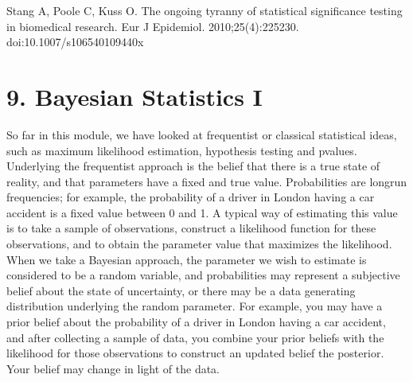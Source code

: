 \documentclass[letterpaper,10pt,english]{jupyterBook}
\begin{document}
\sphinxAtStartPar
Stang A, Poole C, Kuss O. The ongoing tyranny of statistical significance testing in biomedical research. Eur J Epidemiol. 2010;25(4):225\sphinxhyphen{}230. doi:10.1007/s10654\sphinxhyphen{}010\sphinxhyphen{}9440\sphinxhyphen{}x

\sphinxAtStartPar
{}

\sphinxAtStartPar
{}

\sphinxAtStartPar
{}


\chapter{9. Bayesian Statistics I}
\label{\detokenize{09.a. Bayesian Statistics I:bayesian-statistics-i}}\label{\detokenize{09.a. Bayesian Statistics I::doc}}
\sphinxAtStartPar
So far in this module, we have looked at frequentist or classical statistical ideas, such as maximum likelihood estimation, hypothesis testing and p\sphinxhyphen{}values. Underlying the frequentist approach is the belief that there is a true state of reality, and that parameters have a fixed and true value. Probabilities are long\sphinxhyphen{}run frequencies; for example, the probability of a driver in London having a car accident is a fixed value between 0 and 1. A typical way of estimating this value is to take a sample of observations, construct a likelihood function for these observations, and to obtain the parameter value that maximizes the likelihood. When we take a Bayesian approach, the parameter we wish to estimate is considered to be a random variable, and probabilities may represent a subjective belief about the state of uncertainty, or there may be a data generating distribution underlying the random parameter. For example, you may have a prior belief about the probability of a driver in London having a car accident, and after collecting a sample of data, you combine your prior beliefs with the likelihood for those observations to construct an updated belief \sphinxhyphen{} the posterior. Your belief may change in light of the data.
\end{document}
